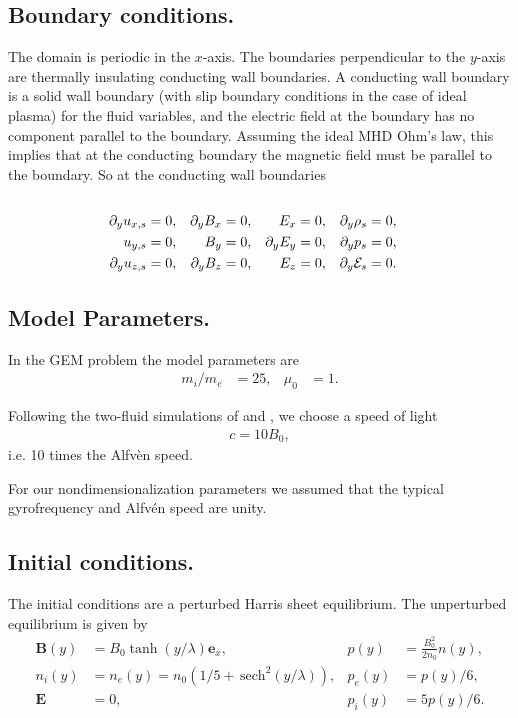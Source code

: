 \documentclass[12pt,fleqn]{article}
\numberwithin{equation}{section}
\begin{document}
\subsection{Boundary conditions.}
The domain is periodic in the $x$-axis.
The boundaries perpendicular to the $y$-axis
are thermally insulating conducting wall boundaries.  
A conducting wall boundary is a solid wall boundary
(with slip boundary conditions in the case of ideal plasma)
for the fluid variables, and the electric field at
the boundary has no component parallel to the boundary.
Assuming the ideal MHD Ohm's law, this implies that
at the conducting boundary the magnetic field must be parallel to 
the boundary.  So at the conducting wall boundaries
\begin{align*}
 \\ \partial_y u_{x,s} &= 0,
 &  \partial_y B_x &= 0,
 &  E_x &= 0,
 & \partial_y \rho_s &= 0,
 \\ u_{y,s} &= 0,
 &  B_y &= 0,
 &  \partial_y E_y &= 0,
 & \partial_y p_s &= 0,
 \\ \partial_y u_{z,s} &= 0,
 &  \partial_y B_z &= 0,
 &  E_z &= 0,
 & \partial_y \mathcal{E}_s &= 0.
\end{align*}

\subsection{Model Parameters.}
In the GEM problem the model parameters are
\begin{align*}
   m_i/m_e &= 25,
 & \mu_0 &= 1.
\end{align*}

Following the two-fluid simulations of
\cite{article:Loverich05} and \cite{article:Hakim06},
we choose a speed of light
\begin{align*}
  c = 10 B_0,
\end{align*}
i.e. 10 times the Alfv\`en speed.

For our nondimensionalization parameters we assumed that
the typical gyrofrequency and Alfv\'en speed are unity.

\subsection{Initial conditions.}
The initial conditions are a perturbed Harris sheet equilibrium.
The unperturbed equilibrium is given by
\def\e{\mathbf{e}}
\def\B{\mathbf{B}}
\def\E{\mathbf{E}}
\def\J{\mathbf{J}}
\def\sech{\,\mathrm{sech}}
\begin{align*}
    \B(y) & =B_0\tanh(y/\lambda)\e_x,
  & p(y) &= \frac{B_0^2}{2 n_0} n(y),
 \\ n_i(y) &= n_e(y)
            = n_0(1/5+\sech^2(y/\lambda)),
  & p_e(y) &= p(y)/6,
 \\ \E & =0,
  & p_i(y) &= 5p(y)/6.
\end{align*}
\end{document}
